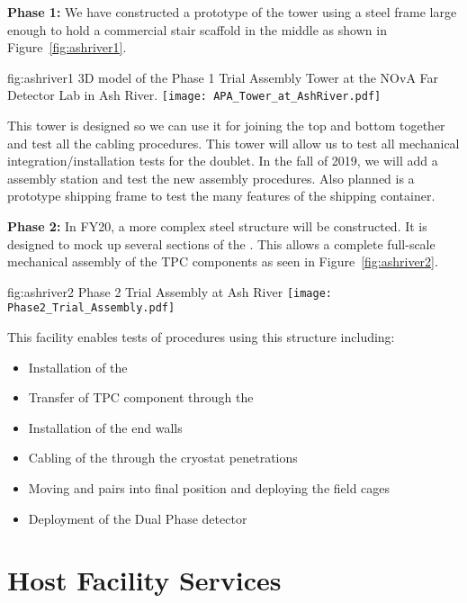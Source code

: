 {\bf Phase 1:} We have constructed a prototype of the   tower
using a steel frame large enough to hold a commercial stair scaffold
in the middle as shown in Figure~\ref{fig:ashriver1}.
\begin{dunefigure}{fig:ashriver1}
  {3D model of the Phase 1 Trial Assembly  Tower at the NOvA Far Detector
    Lab in Ash River.}
  \texttt{[image: APA\_Tower\_at\_AshRiver.pdf]}
\end{dunefigure}
This  tower is designed so we can use it for joining the
top and bottom  together and test all the cabling
procedures.  This tower will allow us to test all mechanical
integration/installation tests for the  doublet. In the
fall of 2019, we will add a  assembly station and test the
new  assembly procedures.  Also planned is a prototype
 shipping frame to test the many features of the shipping
container.

{\bf Phase 2:} In FY20, a more complex steel structure will be
constructed. It is designed to mock up several sections of the
. This allows a complete full-scale mechanical assembly of
the TPC components as seen in Figure~\ref{fig:ashriver2}.
\begin{dunefigure}{fig:ashriver2}
  {Phase 2 Trial Assembly at Ash River}
  \texttt{[image: Phase2\_Trial\_Assembly.pdf]}
\end{dunefigure}
This facility enables tests of procedures using this structure including:
\begin{itemize}
 \item Installation of the 
 \item Transfer of TPC component through the 
 \item Installation of the end walls
 \item Cabling of the  through the cryostat penetrations
 \item Moving  and  pairs into final position and deploying the field cages
 \item Deployment of the Dual Phase detector
\end{itemize}

\section{ Host Facility Services}
\label{sec:fdsp-coord-host_facility_services}


